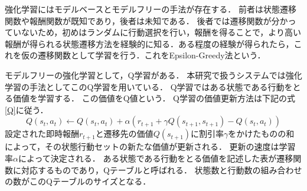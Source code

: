 \documentclass[12pt,a4paper,twoside,openany]{jbook}
\begin{document}
強化学習にはモデルベースとモデルフリーの手法が存在する．
前者は状態遷移関数や報酬関数が既知であり，後者は未知である．
後者では遷移関数が分かっていないため，初めはランダムに行動選択を行い，報酬を得ることで，より高い報酬が得られる状態遷移方法を経験的に知る．ある程度の経験が得られたら，これを仮の遷移関数として学習を行う．これをEpsilon-Greedy法という．


モデルフリーの強化学習として，Q学習がある．
本研究で扱うシステムでは強化学習の手法としてこのQ学習を用いている．
Q学習ではある状態である行動をとる価値を学習する．
この価値をQ値という．
Q学習の価値更新方法は下記の式\ref{Q}に従う．
\begin{equation}
\label{Q}
Q(s_t,a_t) \leftarrow Q(s_t,a_t) + \alpha(r_{t+1} + \gamma Q(s_{t+1},s_{t+1}) - Q(s_t,a_t))
\end{equation}
設定された即時報酬$r_{t+1}$と遷移先の価値$Q(s_{t+1})$に割引率$\gamma$をかけたものの和によって，その状態行動セットの新たな価値が更新される．
更新の速度は学習率$\alpha$によって決定される．
ある状態である行動をとる価値を記述した表が遷移関数に対応するものであり，Qテーブルと呼ばれる．
状態数と行動数の組み合わせの数がこのQテーブルのサイズとなる．

\end{document}
